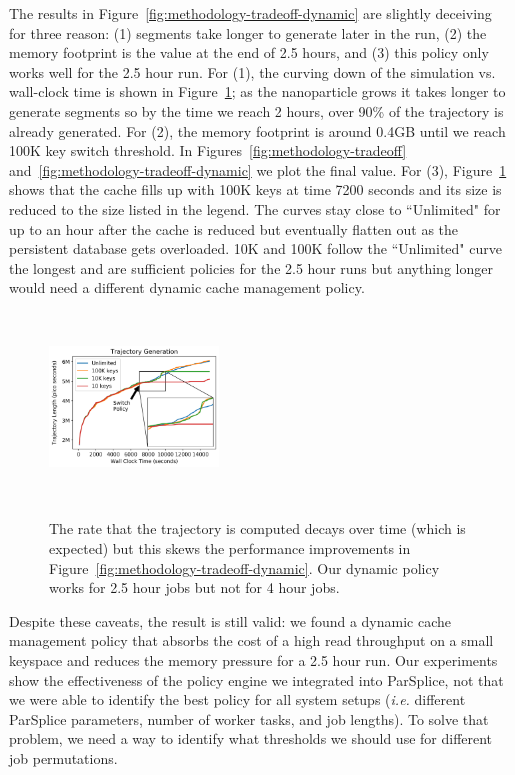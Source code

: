 The results in Figure~\ref{fig:methodology-tradeoff-dynamic} are slightly
deceiving for three reason: (1) segments take longer to generate later in the
run, (2) the memory footprint is the value at the end of 2.5 hours, and (3)
this policy only works well for the 2.5 hour run.  For (1), the curving down of
the simulation vs. wall-clock time is shown in
Figure~\ref{fig:methodology-trajectory}; as the nanoparticle grows it takes
longer to generate segments so by the time we reach 2 hours, over 90\% of the
trajectory is already generated.  For (2), the memory footprint is around 0.4GB
until we reach 100K key switch threshold. In
Figures~\ref{fig:methodology-tradeoff}
and~\ref{fig:methodology-tradeoff-dynamic} we plot the final value. For (3),
Figure~\ref{fig:methodology-trajectory} shows that the cache fills up with 100K
keys at time 7200 seconds and its size is reduced to the size listed in the
legend.  The curves stay close to ``Unlimited" for up to an hour after the
cache is reduced but eventually flatten out as the persistent database gets
overloaded. 10K and 100K follow the ``Unlimited" curve the longest and are
sufficient policies for the 2.5 hour runs but anything longer would need a
different dynamic cache management policy.

\begin{figure}[t]
  \noindent\includegraphics[height=5cm,width=0.4\textwidth]{figures/methodology-trajectory.png}\\
  \caption{The rate that the trajectory is computed decays over time (which is
  expected) but this skews the performance improvements in
  Figure~\ref{fig:methodology-tradeoff-dynamic}. Our dynamic policy works for 2.5
  hour jobs but not for 4 hour jobs.  \label{fig:methodology-trajectory}}
\end{figure}

Despite these caveats, the result is still valid: we found a dynamic cache 
management policy that absorbs the cost of a high read throughput on a small
keyspace and reduces the memory pressure for a 2.5 hour run. Our experiments
show the effectiveness of the policy engine we integrated into
ParSplice, not that we were able to identify the best policy for all system
setups ({\it i.e.} different ParSplice parameters, number of worker tasks, and
job lengths).  To solve that problem, we need a way to identify what thresholds
we should use for different job permutations.

